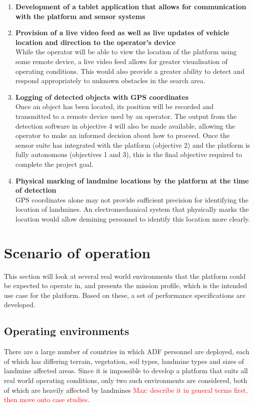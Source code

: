 \documentclass[main.tex]{subfiles}
\begin{document}
\begin{enumerate}
\item \textbf{Development of a tablet application that allows for communication with the platform and sensor systems}\\ 

\item \textbf{Provision of a live video feed as well as live updates of vehicle location and direction to the operator's device}\\ While the operator will be able to view the location of the platform using some remote device, a live video feed allows for greater visualisation of operating conditions. This would also provide a greater ability to detect and respond appropriately to unknown obstacles in the search area.

\item \textbf{Logging of detected objects with GPS coordinates}\\ Once an object has been located, its position will be recorded and transmitted to a remote device used by an operator. The output from the detection software in objective 4 will also be made available, allowing the operator to make an informed decision about how to proceed. Once the sensor suite has integrated with the platform (objective 2) and the platform is fully autonomous (objectives 1 and 3), this is the final objective required to complete the project goal.

\item \textbf{Physical marking of landmine locations by the platform at the time of detection}\\ GPS coordinates alone may not provide sufficient precision for identifying the location of landmines. An electromechanical system that physically marks the location would allow demining personnel to identify this location more clearly.

\end{enumerate}

\section{Scenario of operation}
This section will look at several real world environments that the platform could be expected to operate in, and presents the mission profile, which is the intended use case for the platform. Based on these, a set of performance specifications are developed.  

\subsection{Operating environments}
There are a large number of countries in which ADF personnel are deployed, each of which has differing terrain, vegetation, soil types, landmine types and sizes of landmine affected areas. Since it is impossible to develop a platform that suits all real world operating conditions, only two such environments are considered, both of which are heavily affected by landmines \parencite{AustralianGovernment2016} \textcolor{red}{Maz: describe it in general terms first, then move onto case studies}. 
\end{document}
